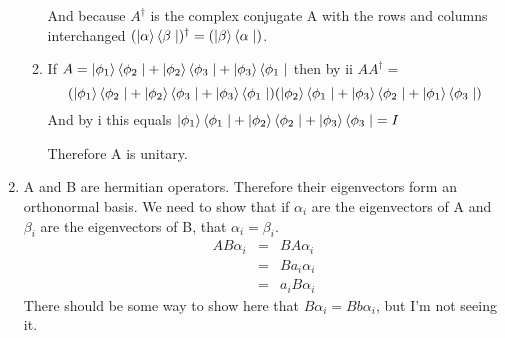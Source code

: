 \documentclass[11pt,fleqn]{article}
\begin{document}
\begin{enumerate}
\begin{enumerate}
And because $A^{\dag}$ is the complex conjugate A with the rows and columns interchanged $(\left | \alpha \right \rangle\left \langle \beta \right.|)^{\dag} = (\left | \beta \right \rangle\left \langle \alpha \right.|)$.
\item %
If $A = \left | \phi_1 \right \rangle\left \langle \phi_2 \right.| + \left | \phi_2 \right \rangle\left \langle \phi_3 \right.| + \left | \phi_3 \right \rangle\left \langle \phi_1 \right.|$ then by ii $AA^{\dag} = $ 
\[
(\left | \phi_1 \right \rangle\left \langle \phi_2 \right.| + \left | \phi_2 \right \rangle\left \langle \phi_3 \right.| + \left | \phi_3 \right \rangle\left \langle \phi_1 \right.|)
(\left | \phi_2 \right \rangle\left \langle \phi_1 \right.| + \left | \phi_3 \right \rangle\left \langle \phi_2 \right.| + \left | \phi_1 \right \rangle\left \langle \phi_3 \right.|)
\]
And by i this equals $\left | \phi_1 \right \rangle\left \langle \phi_1 \right.| + \left | \phi_2 \right \rangle\left \langle \phi_2 \right.| + \left | \phi_3 \right \rangle\left \langle \phi_3 \right.| = I$

Therefore A is unitary. 
\end{enumerate}

\item %
A and B are hermitian operators. Therefore their eigenvectors form an orthonormal basis. We need to show that if $\alpha_i$ are the eigenvectors of A and $\beta_i$ are the eigenvectors of B, that $\alpha_i=\beta_i$. 
\begin{eqnarray}
AB\alpha_i &=& BA\alpha_i \\
&=& Ba_i\alpha_i \\
&=& a_iB\alpha_i
\end{eqnarray}
There should be some way to show here that $B\alpha_i = Bb\alpha_i$, but I'm not seeing it.
\end{enumerate}
\end{document}
